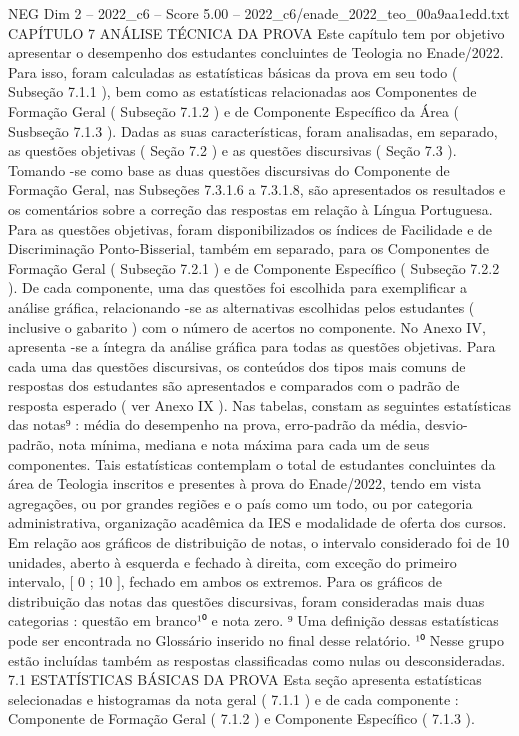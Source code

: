 \begin{textsample}{NEG Dim 2 – 2022\_c6 – Score 5.00 – 2022\_c6/enade\_2022\_teo\_00a9aa1edd.txt}  \label{ex:f2_neg_299}
CAPÍTULO 7 ANÁLISE TÉCNICA DA PROVA Este capítulo tem por objetivo apresentar o desempenho dos estudantes concluintes de Teologia no Enade/2022.
Para isso, foram calculadas as estatísticas básicas da prova em seu todo ( Subseção 7.1.1 ), bem como as estatísticas relacionadas aos Componentes de Formação Geral ( Subseção 7.1.2 ) e de Componente Específico da Área ( Susbseção 7.1.3 ).
Dadas as suas características, foram analisadas, em separado, as questões objetivas ( Seção 7.2 ) e as questões discursivas ( Seção 7.3 ).
Tomando -se como base as duas questões discursivas do Componente de Formação Geral, nas Subseções 7.3.1.6 a 7.3.1.8, são apresentados os resultados e os comentários sobre a correção das respostas em relação à Língua Portuguesa.
Para as questões objetivas, foram disponibilizados os índices de Facilidade e de Discriminação Ponto-Bisserial, também em separado, para os Componentes de Formação Geral ( Subseção 7.2.1 ) e de Componente Específico ( Subseção 7.2.2 ).
De cada componente, uma das questões foi escolhida para exemplificar a análise gráfica, relacionando -se as alternativas escolhidas pelos estudantes ( inclusive o gabarito ) com o número de acertos no componente.
No Anexo IV, apresenta -se a íntegra da análise gráfica para todas as questões objetivas.
Para cada uma das questões discursivas, os conteúdos dos tipos mais comuns de respostas dos estudantes são apresentados e comparados com o padrão de resposta esperado ( ver Anexo IX ).
Nas tabelas, constam as seguintes estatísticas das notas⁹ : média do desempenho na prova, erro-padrão da média, desvio-padrão, nota mínima, mediana e nota máxima para cada um de seus componentes.
Tais estatísticas contemplam o total de estudantes concluintes da área de Teologia inscritos e presentes à prova do Enade/2022, tendo em vista agregações, ou por grandes regiões e o país como um todo, ou por categoria administrativa, organização acadêmica da IES e modalidade de oferta dos cursos.
Em relação aos gráficos de distribuição de notas, o intervalo considerado foi de 10 unidades, aberto à esquerda e fechado à direita, com exceção do primeiro intervalo, [ 0 ; 10 ], fechado em ambos os extremos.
Para os gráficos de distribuição das notas das questões discursivas, foram consideradas mais duas categorias : questão em branco¹⁰ e nota zero. ⁹ Uma definição dessas estatísticas pode ser encontrada no Glossário inserido no final desse relatório. ¹⁰ Nesse grupo estão incluídas também as respostas classificadas como nulas ou desconsideradas. 7.1 ESTATÍSTICAS BÁSICAS DA PROVA Esta seção apresenta estatísticas selecionadas e histogramas da nota geral ( 7.1.1 ) e de cada componente : Componente de Formação Geral ( 7.1.2 ) e Componente Específico ( 7.1.3 ).

\end{textsample}

